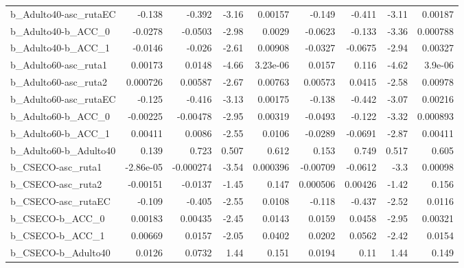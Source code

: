 \begin{tabular}{lrrrrrrrr}
b\_Adulto40-asc\_rutaEC      &      -0.138 &       -0.392 &     -3.16 &  0.00157 &     -0.149 &      -0.411 &        -3.11 &       0.00187 \\
b\_Adulto40-b\_ACC\_0         &     -0.0278 &      -0.0503 &     -2.98 &   0.0029 &    -0.0623 &      -0.133 &        -3.36 &      0.000788 \\
b\_Adulto40-b\_ACC\_1         &     -0.0146 &       -0.026 &     -2.61 &  0.00908 &    -0.0327 &     -0.0675 &        -2.94 &       0.00327 \\
b\_Adulto60-asc\_ruta1       &     0.00173 &       0.0148 &     -4.66 & 3.23e-06 &     0.0157 &       0.116 &        -4.62 &       3.9e-06 \\
b\_Adulto60-asc\_ruta2       &    0.000726 &      0.00587 &     -2.67 &  0.00763 &    0.00573 &      0.0415 &        -2.58 &       0.00978 \\
b\_Adulto60-asc\_rutaEC      &      -0.125 &       -0.416 &     -3.13 &  0.00175 &     -0.138 &      -0.442 &        -3.07 &       0.00216 \\
b\_Adulto60-b\_ACC\_0         &    -0.00225 &     -0.00478 &     -2.95 &  0.00319 &    -0.0493 &      -0.122 &        -3.32 &      0.000893 \\
b\_Adulto60-b\_ACC\_1         &     0.00411 &       0.0086 &     -2.55 &   0.0106 &    -0.0289 &     -0.0691 &        -2.87 &       0.00411 \\
b\_Adulto60-b\_Adulto40      &       0.139 &        0.723 &     0.507 &    0.612 &      0.153 &       0.749 &        0.517 &         0.605 \\
b\_CSECO-asc\_ruta1          &   -2.86e-05 &    -0.000274 &     -3.54 & 0.000396 &   -0.00709 &     -0.0612 &         -3.3 &       0.00098 \\
b\_CSECO-asc\_ruta2          &    -0.00151 &      -0.0137 &     -1.45 &    0.147 &   0.000506 &     0.00426 &        -1.42 &         0.156 \\
b\_CSECO-asc\_rutaEC         &      -0.109 &       -0.405 &     -2.55 &   0.0108 &     -0.118 &      -0.437 &        -2.52 &        0.0116 \\
b\_CSECO-b\_ACC\_0            &     0.00183 &      0.00435 &     -2.45 &   0.0143 &     0.0159 &      0.0458 &        -2.95 &       0.00321 \\
b\_CSECO-b\_ACC\_1            &     0.00669 &       0.0157 &     -2.05 &   0.0402 &     0.0202 &      0.0562 &        -2.42 &        0.0154 \\
b\_CSECO-b\_Adulto40         &      0.0126 &       0.0732 &      1.44 &    0.151 &     0.0194 &        0.11 &         1.44 &         0.149 \\

\end{tabular}
